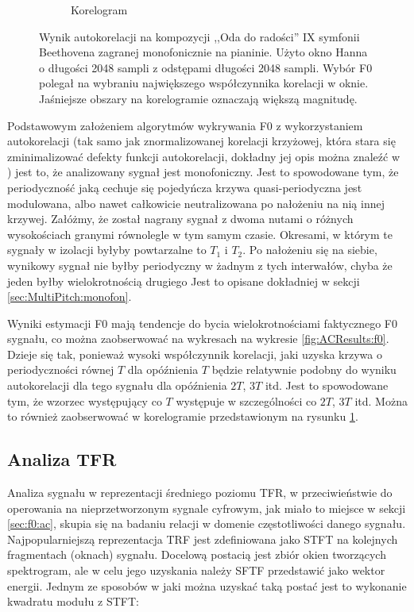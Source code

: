 \documentclass[12pt,a4paper,twoside]{mwart}
\begin{document}
\begin{figure}[t]
\begin{subfigure}{1\textwidth}
    \caption{Korelogram}
    \label{fig:ACResults:corr}
  \end{subfigure}
  \caption{Wynik autokorelacji na kompozycji ,,Oda do radości'' IX symfonii Beethovena zagranej monofonicznie na pianinie. Użyto okno Hanna o długości 2048 sampli z odstępami długości 2048 sampli. Wybór F0 polegał na wybraniu największego współczynnika korelacji w oknie. Jaśniejsze obszary na korelogramie oznaczają większą magnitudę.}
  \label{fig:ACResults}
\end{figure}

Podstawowym założeniem algorytmów wykrywania F0 z wykorzystaniem autokorelacji (tak samo jak znormalizowanej korelacji krzyżowej, która stara się zminimalizować defekty funkcji autokorelacji, dokładny jej opis można znaleźć w \cite{Transcription:Talkin:RAPT}) jest to, że analizowany sygnał jest monofoniczny. Jest to spowodowane tym, że periodyczność jaką cechuje się pojedyńcza krzywa quasi-periodyczna jest modulowana, albo nawet całkowicie neutralizowana po nałożeniu na nią innej krzywej. Załóżmy, że został nagrany sygnał z dwoma nutami o różnych wysokościach granymi równolegle w tym samym czasie. Okresami, w którym te sygnały w izolacji byłyby powtarzalne to $T_1$ i $T_2$. Po nałożeniu się na siebie, wynikowy sygnał nie byłby periodyczny w żadnym z tych interwałów, chyba że jeden byłby wielokrotnością drugiego Jest to opisane dokładniej w sekcji \ref{sec:MultiPitch:monofon}.

Wyniki estymacji F0 mają tendencje do bycia wielokrotnościami faktycznego F0 sygnału, co można zaobserwować na wykresach na wykresie \ref{fig:ACResults:f0}. Dzieje się tak, ponieważ wysoki współczynnik korelacji, jaki uzyska krzywa o periodyczności równej $T$ dla opóźnienia $T$ będzie relatywnie podobny do wyniku autokorelacji dla tego sygnału dla opóźnienia $2T$, $3T$ itd. Jest to spowodowane tym, że wzorzec występujący co $T$ występuje w szczególności co $2T$, $3T$ itd. Można to również zaobserwować w korelogramie przedstawionym na rysunku \ref{fig:ACResults:corr}. \cite[238-250]{Transcription:Anssi:SignalProcessingMethods}

\subsection{Analiza TFR} \label{sec:f0:tfr}
Analiza sygnału w reprezentacji średniego poziomu TFR, w przeciwieństwie do operowania na nieprzetworzonym sygnale cyfrowym, jak miało to miejsce w sekcji \ref{sec:f0:ac}, skupia się na badaniu relacji w domenie częstotliwości danego sygnału. Najpopularniejszą reprezentacja TRF jest zdefiniowana jako STFT na kolejnych fragmentach (oknach) sygnału. Docelową postacią jest zbiór okien tworzących spektrogram, ale w celu jego uzyskania należy SFTF przedstawić jako wektor energii. Jednym ze sposobów w jaki można uzyskać taką postać jest to wykonanie kwadratu modułu z STFT:
\end{document}
